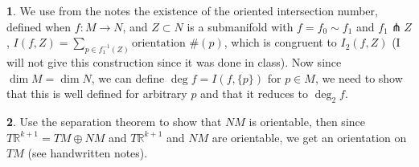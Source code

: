 \documentclass[10.5pt]{article}
\theoremstyle{definition}
\newtheorem{pb}{}
\newcommand{\set}[1]{\{#1\}}
\begin{document}
    \begin{pb}
        We use from the notes the existence of the oriented intersection number, defined when \(f: M \to N\), and \(Z \subset N\) is a submanifold with \(f = f_0 \sim f_1\) and \(f_1 \pitchfork Z\), \(I(f,Z) = \sum_{p \in f_1^{-1}(Z)} \text{orientation }\#(p)\), which is congruent to \(I_2(f,Z)\) (I will not give this construction since it was done in class). Now since \(\dim M = \dim N\), we can define \(\deg f = I(f,\set{p})\) for \(p \in M\), we need to show that this is well defined for arbitrary \(p\) and that it reduces to \(\deg_2 f\).
    \end{pb}
    \begin{pb}
        Use the separation theorem to show that \(NM\) is orientable, then since \(T \mathbb{R}^{k+1} = TM \oplus NM\) and \(T \mathbb{R}^{k+1}\) and \(NM\) are orientable, we get an orientation on \(TM\) (see handwritten notes).
    \end{pb}
\end{document}
